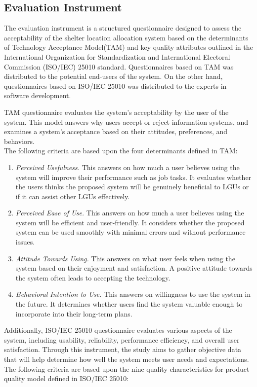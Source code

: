 \subsection{Evaluation Instrument}
	The evaluation instrument is a structured questionnaire designed to assess the acceptability of the shelter location allocation system based on the determinants of Technology Acceptance Model(TAM) and key quality attributes outlined in the International Organization for Standardization and International Electoral Commission (ISO/IEC) 25010 standard. Questionnaires based on TAM was distributed to the potential end-users of the system. On the other hand, questionnaires based on ISO/IEC 25010 was distributed to the experts in software development.
	
	TAM questionnaire evaluates the system's acceptability by the user of the system. This model answers why users accept or reject information systems, and examines a system's acceptance based on their attitudes, preferences, and behaviors.\parencite{Davis1987}
	\\The following criteria are based upon the four determinants defined in TAM:
	\begin{enumerate}
		\item \textit{Perceived Usefulness.} This answers on how much a user believes using the system will improve their performance such as job tasks. It evaluates whether the users thinks the proposed system will be genuinely beneficial to LGUs or if it can assist other LGUs effectively.
		
		\item \textit{Perceived Ease of Use.} This answers on how much a user believes using the system will be efficient and user-friendly. It considers whether the proposed system can be used smoothly with minimal errors and without performance issues.
		
		\item \textit{Attitude Towards Using.} This answers on what user feels when using the system based on their enjoyment and satisfaction. A positive attitude towards the system often leads to accepting the technology.
		
		\item \textit{Behavioral Intention to Use.} This answers on willingness to use the system in the future. It determines whether users find the system valuable enough to incorporate into their long-term plans.
	\end{enumerate}
	
	
	Additionally, ISO/IEC 25010 questionnaire evaluates various aspects of the system, including usability, reliability, performance efficiency, and overall user satisfaction. Through this instrument, the study aims to gather objective data that will help determine how well the system meets user needs and expectations. \parencite{ISOIEC2023}
	\\The following criteria are based upon the nine quality characteristics for product quality model defined in ISO/IEC 25010:
	
